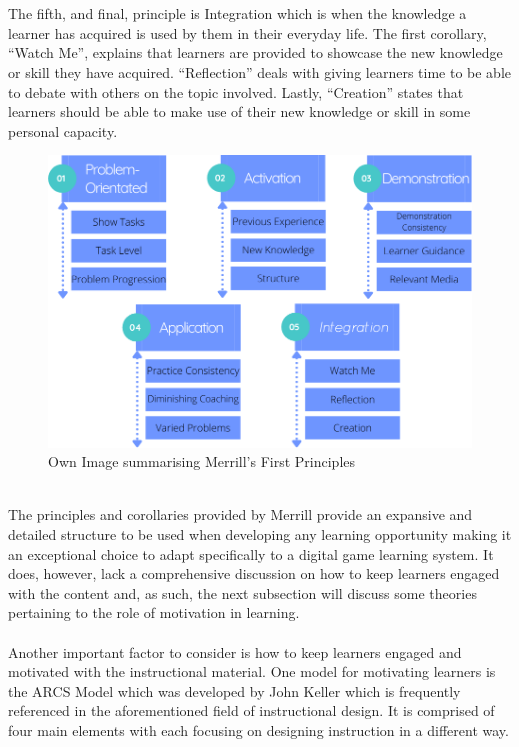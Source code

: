 \documentclass[conference]{IEEEtran}
\begin{document}
\\\\
The fifth, and final, principle is Integration which is when the knowledge a learner has acquired is used by them in their everyday life\cite{Merrill2002}. The first corollary, “Watch Me”, explains that learners are provided to showcase the new knowledge or skill they have acquired\cite{Merrill2002}. “Reflection” deals with giving learners time to be able to debate with others on the topic involved\cite{Merrill2002}. Lastly, “Creation” states that learners should be able to make use of their new knowledge or skill in some personal capacity\cite{Merrill2002}.
\\
\begin{figure}[htbp]
\centerline{\includegraphics[scale=0.37]{merrill2.png}}
\caption{Own Image summarising Merrill's First Principles}
\label{fig}
\end{figure}
\\
The principles and corollaries provided by Merrill\cite{Merrill2002} provide an expansive and detailed structure to be used when developing any learning opportunity making it an exceptional choice to adapt specifically to a digital game learning system.  It does, however, lack a comprehensive discussion on how to keep learners engaged with the content and, as such, the next subsection will discuss some theories pertaining to the role of motivation in learning.
\\\\
Another important factor to consider is how to keep learners engaged and motivated with the instructional material. One model for motivating learners is the ARCS Model which was developed by John Keller\cite{keller1987development} which is frequently referenced in the aforementioned field of instructional design\cite{Kapp2012a}. It is comprised of four main elements with each focusing on designing instruction in a different way\cite{Kapp2012a, keller1987development}. 
\end{document}
